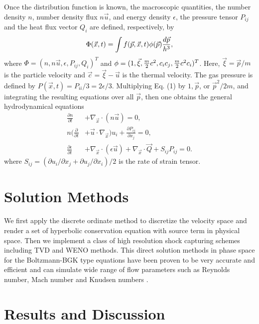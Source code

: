 \documentclass[twoside,twocolumn,prc,floats,amsmath,amssymb]{revtex4} %
\begin{document}
Once the distribution function is known, the macroscopic quantities, the
number density $n$, number density flux $n \vec u$, and energy density $\epsilon$, the pressure tensor $P_{ij}$
and the heat flux vector $Q_{i}$ are defined, respectively, by
\begin{align}
\Phi (\vec x, t) = \int  f(\vec p, \vec x, t) \phi(\vec p){d \vec p \over h^3},
\end{align}
where $\Phi =(n, n\vec u, \epsilon, P_{ij}, Q_{i})^T$ and $\phi=(1, \vec \xi, {m\over 2} c^2, c_{i} c_{j}, {m\over 2}c^2 c_{i} )^T$.  Here, $\vec \xi =\vec p/m$ is the particle velocity and $\vec c= \vec \xi - \vec u$ is the thermal velocity.  The gas pressure is defined by $P(\vec x, t) = P_{i i}/3 = 2 \epsilon /3$. Multiplying Eq. (1) by $1, \vec p$, or $\vec p^2/2m$, and integrating the resulting equations over all $\vec p$, then one obtains the general hydrodynamical equations
\begin{align}
\frac{ \partial n}{\partial t} &+ \nabla_{\vec x} \cdot (n \vec u) = 0, \\
n ( \frac{ \partial }{\partial t} &+ \vec u \cdot \nabla_{\vec x}) u_{i} + \frac{\partial P_{ij} }{\partial x_{j} } = 0, \\ 
\frac{\partial \epsilon}{\partial t} &+ \nabla_{\vec x} \cdot (\epsilon \vec u) + \nabla_{\vec x} \cdot \vec Q + S_{ij} P_{ij} = 0.
\end{align}
where $S_{ij}=(\partial u_{i}/\partial x_{j} +
\partial u_{j}/\partial x_{i})/2$ is the rate of strain tensor.

\section{Solution Methods}

We first apply the discrete ordinate method to discretize the velocity space and render a set of hyperbolic conservation equation with source term in physical space.  Then we implement a class of high resolution shock capturing schemes including TVD and WENO methods.   This direct solution methods in phase space for the Boltzmann-BGK type equations have been proven to be very accurate and efficient and can simulate wide range of flow parameters such as Reynolds number, Mach number and Knudsen numbers \cite{Yang1995, Yang2013}.

\section{Results and Discussion}
\end{document}
